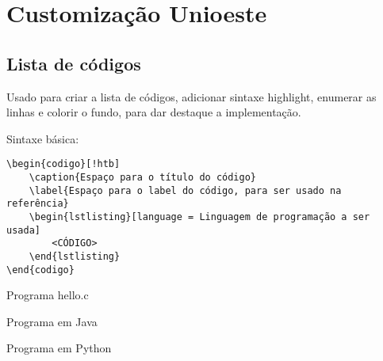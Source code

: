 \chapter{Customização Unioeste}

\section{Lista de códigos}

Usado para criar a lista de códigos, adicionar sintaxe highlight, enumerar as linhas e colorir o fundo, para dar destaque a implementação.

Sintaxe básica:
\begin{verbatim}
\begin{codigo}[!htb]
    \caption{Espaço para o título do código}
    \label{Espaço para o label do código, para ser usado na referência}  
    \begin{lstlisting}[language = Linguagem de programação a ser usada]
        <CÓDIGO>
    \end{lstlisting}
\end{codigo}
\end{verbatim}

\begin{codigo}[h]
  \caption{Programa hello.c}
  \label{codigoC}
    
\end{codigo}

\begin{codigo}[h]
  \caption{Programa em Java}
  \label{codigoJava}
    
\end{codigo}

\begin{codigo}[h]
  \caption{Programa em Python}
  \label{codigoPython}
    
\end{codigo}
